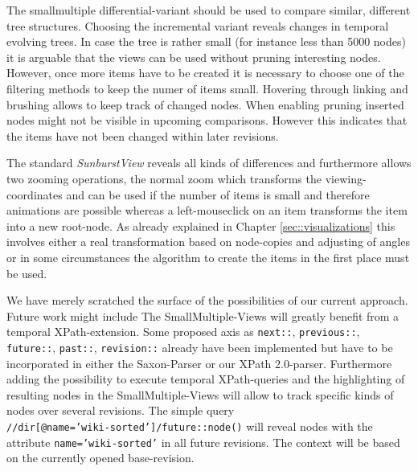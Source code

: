 The smallmultiple differential-variant should be used to compare similar, different tree structures. Choosing the incremental variant reveals changes in temporal evolving trees. In case the tree is rather small (for instance less than 5000 nodes) it is arguable that the views can be used without pruning interesting nodes. However, once more items have to be created it is necessary to choose one of the filtering methods to keep the numer of items small. Hovering through linking and brushing allows to keep track of changed nodes. When enabling pruning inserted nodes might not be visible in upcoming comparisons. However this indicates that the items have not been changed within later revisions. 

The standard \emph{SunburstView} reveals all kinds of differences and furthermore allows two zooming operations, the normal zoom which transforms the viewing-coordinates and can be used if the number of items is small and therefore animations are possible whereas a left-mouseclick on an item transforms the item into a new root-node. As already explained in Chapter \ref{sec::visualizations} this involves either a real transformation based on node-copies and adjusting of angles or in some circumstances the algorithm to create the items in the first place must be used.

We have merely scratched the surface of the possibilities of our current approach. Future work might include  The SmallMultiple-Views will greatly benefit from a temporal XPath-extension. Some proposed axis as \texttt{next::}, \texttt{previous::}, \texttt{future::}, \texttt{past::}, \texttt{revision::} already have been implemented but have to be incorporated in either the Saxon-Parser or our XPath 2.0-parser. Furthermore adding the possibility to execute temporal XPath-queries and the highlighting of resulting nodes in the SmallMultiple-Views will allow to track specific kinds of nodes over several revisions. The simple query \\\texttt{//dir[@name='wiki-sorted']/future::node()} will reveal nodes with the attribute \texttt{name='wiki-sorted'} in all future revisions. The context will be based on the currently opened base-revision. 








